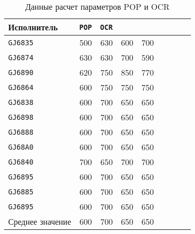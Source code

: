 \begin{table}[]
    \centering
    \caption{Данные расчет параметров POP и OCR} \label{tab:OCR}
    \begin{tabular}{@{}lrrrrrrrr@{}}
    \toprule
    Исполнитель & \texttt{POP} &	\texttt{OCR} &  \\ \midrule
    \texttt{GJ6835}	& 500	& 630	& 600	& 700 &&&& \\
    \texttt{GJ6874}	& 630	& 630	& 700	& 590 &&&& \\
    \texttt{GJ6890}	& 620	& 750	& 850	& 770 &&&& \\
    \texttt{GJ6864}	& 600	& 750	& 750	& 750 &&&& \\
    \texttt{GJ6838} & 600	& 700	& 650	& 650 &&&& \\
    \texttt{GJ6898} & 600	& 700	& 650	& 650 &&&& \\
    \texttt{GJ6888} & 600	& 700	& 650	& 650 &&&& \\
    \texttt{GJ68А0} & 600	& 700	& 650	& 650 &&&& \\
    \texttt{GJ6840} & 700	& 650	& 700	& 700 &&&& \\ 
    \texttt{GJ6895} & 600 & 700 & 650 & 650 &&&& \\
    \texttt{GJ6885} & 600 & 700 & 650 & 650 &&&& \\
    \texttt{GJ6895} & 600 & 700 & 650 & 650 &&&& \\ 
    Среднее значение & 600 & 700 & 650 & 650 \\ \midrule
    \bottomrule 
    \end{tabular}
    \\ 
\end{table}

